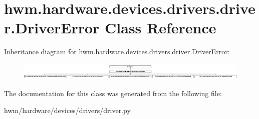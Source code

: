 \hypertarget{classhwm_1_1hardware_1_1devices_1_1drivers_1_1driver_1_1_driver_error}{\section{hwm.\-hardware.\-devices.\-drivers.\-driver.\-Driver\-Error Class Reference}
\label{classhwm_1_1hardware_1_1devices_1_1drivers_1_1driver_1_1_driver_error}
}
Inheritance diagram for hwm.\-hardware.\-devices.\-drivers.\-driver.\-Driver\-Error\-:\begin{figure}[H]
\begin{center}
\leavevmode
\includegraphics[height=0.840000cm]{classhwm_1_1hardware_1_1devices_1_1drivers_1_1driver_1_1_driver_error}
\end{center}
\end{figure}


The documentation for this class was generated from the following file\-:\begin{DoxyCompactItemize}
\item 
hwm/hardware/devices/drivers/driver.\-py\end{DoxyCompactItemize}
